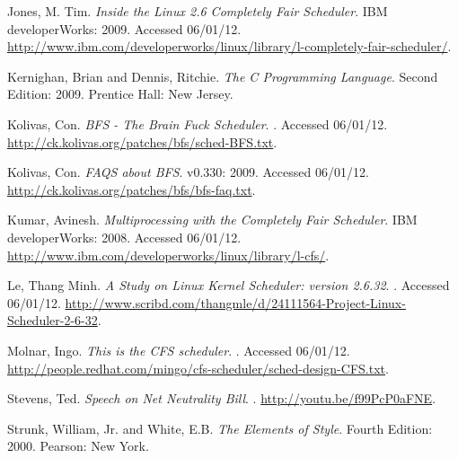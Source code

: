 \documentclass[12pt]{article}
\begin{document}
\begin{thebibliography}{9}

 Jones, M. Tim.
  \newblock \emph{Inside the Linux 2.6 Completely Fair Scheduler}.
  \newblock IBM developerWorks: 2009.
  \newblock Accessed 06/01/12.
  \newblock \url{http://www.ibm.com/developerworks/linux/library/l-completely-fair-scheduler/}.

 Kernighan, Brian and Dennis, Ritchie.
  \newblock \emph{The C Programming Language}.
  \newblock Second Edition: 2009.
  \newblock Prentice Hall: New Jersey.

 Kolivas, Con.
  \newblock \emph{BFS - The Brain Fuck Scheduler}.
  .
  \newblock Accessed 06/01/12.
  \newblock \url{http://ck.kolivas.org/patches/bfs/sched-BFS.txt}.

 Kolivas, Con.
  \newblock \emph{FAQS about BFS}.
  \newblock v0.330: 2009.
  \newblock Accessed 06/01/12.
  \newblock \url{http://ck.kolivas.org/patches/bfs/bfs-faq.txt}.

 Kumar, Avinesh.
  \newblock \emph{Multiprocessing with the Completely Fair Scheduler}.
  \newblock IBM developerWorks: 2008.
  \newblock Accessed 06/01/12.
  \newblock \url{http://www.ibm.com/developerworks/linux/library/l-cfs/}.

 Le, Thang Minh.
  \newblock \emph{A Study on Linux Kernel Scheduler: version 2.6.32}.
  .
  \newblock Accessed 06/01/12.
  \newblock \url{http://www.scribd.com/thangmle/d/24111564-Project-Linux-Scheduler-2-6-32}.

 Molnar, Ingo.
  \newblock \emph{This is the CFS scheduler}.
  .
  \newblock Accessed 06/01/12.
  \newblock \url{http://people.redhat.com/mingo/cfs-scheduler/sched-design-CFS.txt}.

 Stevens, Ted.
  \newblock \emph{Speech on Net Neutrality Bill}.
  .
  \newblock \url{http://youtu.be/f99PcP0aFNE}.

 Strunk, William, Jr. and White, E.B.
  \newblock \emph{The Elements of Style}.
  \newblock Fourth Edition: 2000.
  \newblock Pearson: New York.
  
\end{thebibliography}
\end{document}
